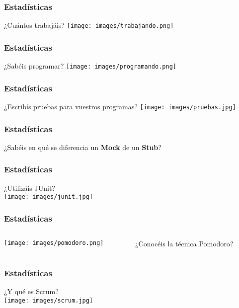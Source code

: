 
 \begin{frame}
  \frametitle{Estadísticas}

  \begin{center}
   {\Huge ¿Cuántos trabajáis?}
   \texttt{[image: images/trabajando.png]}
  \end{center}
 \end{frame}

 \begin{frame}
  \frametitle{Estadísticas}

  \begin{center}
   {\Huge ¿Sabéis programar?}
   \texttt{[image: images/programando.png]}
  \end{center}
 \end{frame}

 \begin{frame}
  \frametitle{Estadísticas}

  \begin{center}
   {\Huge ¿Escribís pruebas para vuestros programas?}
   \texttt{[image: images/pruebas.jpg]}
  \end{center}
 \end{frame}

 \begin{frame}
  \frametitle{Estadísticas}

  \begin{center}
   {\Huge ¿Sabéis en qué se diferencia un \textbf{Mock} de un \textbf{Stub}?}
  \end{center}
 \end{frame}

 \begin{frame}
  \frametitle{Estadísticas}

  \begin{center}
   {\Huge ¿Utilizáis JUnit?}\\[1pc]
   \texttt{[image: images/junit.jpg]}
  \end{center}
 \end{frame}

 \begin{frame}
  \frametitle{Estadísticas}
   \begin{columns}
    \begin{column}{3cm}
     \begin{center}
      \texttt{[image: images/pomodoro.png]}
     \end{center}
    \end{column}
    \begin{column}{7cm}
      {\Huge ¿Conocéis la técnica Pomodoro?}
    \end{column}
   \end{columns}
 \end{frame}

 \begin{frame}
  \frametitle{Estadísticas}

  \begin{center}
   {\Huge ¿Y qué es Scrum?}\\[1pc]
   \texttt{[image: images/scrum.jpg]}
  \end{center}
 \end{frame}
